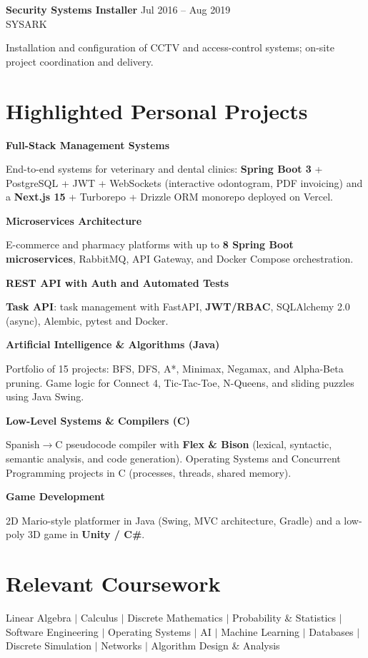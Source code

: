 \documentclass[10pt,letterpaper]{article}
\newcommand{\entry}[4]{%
  \noindent
  \textbf{#1} \hfill {\small\color{textsec}#2}\\
  {\small\color{accent}#3}
  \vspace{0.08cm}
  \par\noindent#4
  \par\vspace{0.16cm}
}
\newcommand{\entrysimple}[2]{%
  \noindent\textbf{#1}\par
  \vspace{0.04cm}
  \noindent#2
  \vspace{0.14cm}\par
}
\begin{document}
\entry{Security Systems Installer}
       {Jul 2016 -- Aug 2019}
       {SYSARK}
       {Installation and configuration of CCTV and access-control systems; on-site project coordination and delivery.}


\newpage
\section*{Highlighted Personal Projects}
\entrysimple{Full-Stack Management Systems}
       {End-to-end systems for veterinary and dental clinics: \textbf{Spring Boot 3} + PostgreSQL + JWT + WebSockets (interactive odontogram, PDF invoicing) and a \textbf{Next.js 15} + Turborepo + Drizzle ORM monorepo deployed on Vercel.}

\entrysimple{Microservices Architecture}
       {E-commerce and pharmacy platforms with up to \textbf{8 Spring Boot microservices}, RabbitMQ, API Gateway, and Docker Compose orchestration.}

\entrysimple{REST API with Auth and Automated Tests}
       {\textbf{Task API}: task management with FastAPI, \textbf{JWT/RBAC}, SQLAlchemy 2.0 (async), Alembic, pytest and Docker.}

\entrysimple{Artificial Intelligence \& Algorithms (Java)}
       {Portfolio of 15 projects: BFS, DFS, A*, Minimax, Negamax, and Alpha-Beta pruning. Game logic for Connect 4, Tic-Tac-Toe, N-Queens, and sliding puzzles using Java Swing.}

\entrysimple{Low-Level Systems \& Compilers (C)}
       {Spanish$\rightarrow$C pseudocode compiler with \textbf{Flex \& Bison} (lexical, syntactic, semantic analysis, and code generation). Operating Systems and Concurrent Programming projects in C (processes, threads, shared memory).}

\entrysimple{Game Development}
       {2D Mario-style platformer in Java (Swing, MVC architecture, Gradle) and a low-poly 3D game in \textbf{Unity / C\#}.}


\vspace{0.5cm}
\section*{Relevant Coursework}
\noindent
{\small\color{textsec}
Linear Algebra \;$\mid$\; Calculus \;$\mid$\; Discrete Mathematics \;$\mid$\; Probability \& Statistics \;$\mid$\;
Software Engineering \;$\mid$\; Operating Systems \;$\mid$\; AI \;$\mid$\; Machine Learning \;$\mid$\;
Databases \;$\mid$\; Discrete Simulation \;$\mid$\; Networks \;$\mid$\; Algorithm Design \& Analysis}
\end{document}
